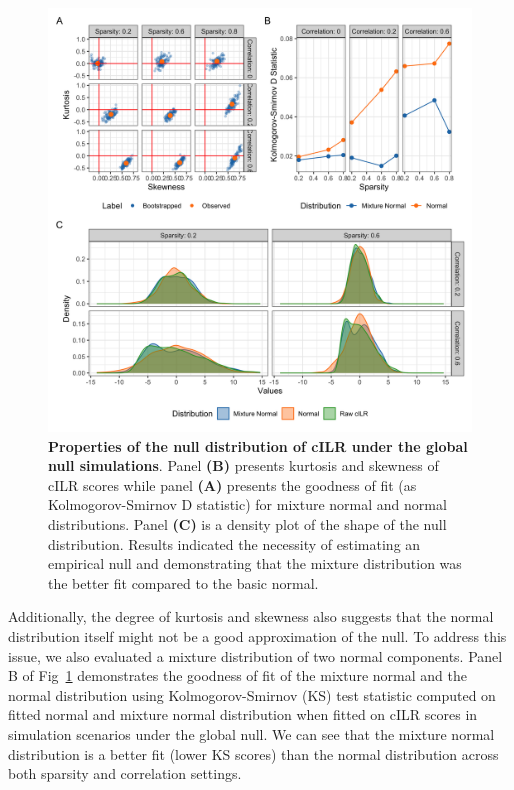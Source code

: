 \documentclass[10pt,letterpaper]{article}
\begin{document}
\begin{figure} [!ht]
    \centering
    \includegraphics[width=\linewidth]{figures/kurtosis_skewness_gof.png}
    \caption{{\bf Properties of the null distribution of cILR under the global null simulations}. Panel \textbf{(B)} presents kurtosis and skewness of cILR scores while panel \textbf{(A)} presents the goodness of fit (as Kolmogorov-Smirnov D statistic) for mixture normal and normal distributions. Panel \textbf{(C)} is a density plot of the shape of the null distribution. Results indicated the necessity of estimating an empirical null and demonstrating that the mixture distribution was the better fit compared to the basic normal.}
    \label{fig:1}
\end{figure}

Additionally, the degree of kurtosis and skewness also suggests that the normal distribution itself might not be a good approximation of the null. To address this issue, we also evaluated a mixture distribution of two normal components. Panel B of Fig~\ref{fig:1} demonstrates the goodness of fit of the mixture normal and the normal distribution using Kolmogorov-Smirnov (KS) test statistic computed on fitted normal and mixture normal distribution when fitted on cILR scores in simulation scenarios under the global null. We can see that the mixture normal distribution is a better fit (lower KS scores) than the normal distribution across both sparsity and correlation settings. 
\end{document}
